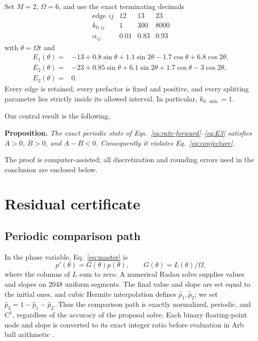 \documentclass[11pt]{article}
\begin{document}
Set \(M=2\), \(\Omega=6\), and use the exact terminating decimals
\begin{equation}
\begin{array}{c|ccc}
\text{edge }ij & 12&13&23\\ \hline
k_{0,ij}&1&300&8000\\
\alpha_{ij}&0.01&0.83&0.93
\end{array}
\label{eq:edgeparameters}
\end{equation}
with \(\theta=\Omega t\) and
\begin{align}
E_1(\theta)={}&-13+0.8\sin\theta+1.1\sin2\theta
                 -1.7\cos\theta+6.8\cos2\theta,
                 \label{eq:E1}\\
E_2(\theta)={}&-23+0.85\sin\theta+6.1\sin2\theta
                 +1.7\cos\theta-3\cos2\theta,
                 \label{eq:E2}\\
E_3(\theta)={}&0.
\label{eq:E3}
\end{align}
Every edge is retained, every prefactor is fixed and positive, and every splitting
parameter lies strictly inside its allowed interval.  In particular,
\(k_{0,\min}=1\).

Our central result is the following.

\medskip
\noindent\textbf{Proposition.}
\emph{The exact periodic state of Eqs.~\eqref{eq:rate-forward}--\eqref{eq:E3}
satisfies \(A>0\), \(B>0\), and \(A-B<0\).  Consequently it violates
Eq.~\eqref{eq:conjecture}.}
\medskip

The proof is computer-assisted; all discretization and rounding errors used in the
conclusion are enclosed below.

\section{Residual certificate}

\subsection{Periodic comparison path}

In the phase variable, Eq.~\eqref{eq:master} is
\begin{equation}
 p'(\theta)=G(\theta)p(\theta),\qquad G(\theta)=L(\theta)/\Omega,
 \label{eq:thetaode}
\end{equation}
where the columns of \(L\) sum to zero.  A numerical Radau solve supplies values and
slopes on 2048 uniform segments.  The final value and slope are set equal to the
initial ones, and cubic Hermite interpolation defines \(\widehat p_1,\widehat p_2\);
we set \(\widehat p_3=1-\widehat p_1-\widehat p_2\).  Thus the comparison path is
exactly normalized, periodic, and \(C^1\), regardless of the accuracy of the
proposal solve.  Each binary floating-point node and slope is converted to its exact
integer ratio before evaluation in Arb ball arithmetic
\cite{johansson2017arb}.
\end{document}
